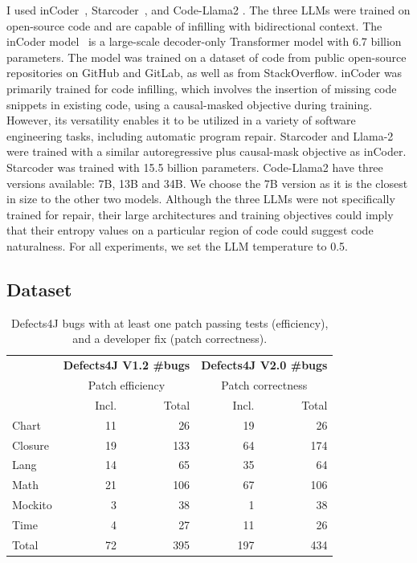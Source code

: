 \documentclass[12pt,openany,oneside,table]{cmuthesis}
\begin{document}
I used inCoder~\cite{inCoder}, Starcoder~\cite{Starcoder}, and Code-Llama2
\cite{Llama}. The three LLMs were trained on open-source code and are capable of
infilling with bidirectional context. The inCoder model~\cite{inCoder} is a
large-scale decoder-only Transformer model with 6.7 billion parameters. The
model was trained on a dataset of code from public open-source repositories on
GitHub and GitLab, as well as from StackOverflow. 
inCoder was primarily trained for code infilling, which involves the insertion
of missing code snippets in existing code, using a causal-masked objective
during training. However, its versatility enables it to be utilized in a variety
of software engineering tasks, including automatic program repair. Starcoder and
Llama-2 were trained with a similar autoregressive plus causal-mask objective as
inCoder. Starcoder was trained with 15.5 billion parameters. Code-Llama2 have
three versions available: 7B, 13B and 34B. We choose the 7B version as it is
the closest in size to the other two models. Although the three LLMs were
not specifically trained for repair, their large architectures and training
objectives could imply that their entropy values on a particular region of code
could suggest code naturalness. For all experiments, we set the LLM temperature
to 0.5.

\subsection{Dataset}
\label{sec:dataset}

\begin{table}[t]
    \centering
  \caption{\small Defects4J bugs with at least one patch passing tests (efficiency), and a developer fix (patch correctness).}
  \begin{tabular}{l|rr|rr}
  \toprule
  & \multicolumn{2}{c}{\textbf{Defects4J V1.2 \#bugs}}  & \multicolumn{2}{c}{\textbf{Defects4J V2.0 \#bugs}}  \\
  & \multicolumn{2}{c}{Patch efficiency}  & \multicolumn{2}{c}{Patch
  correctness}  \\
  & Incl. & Total & Incl. & Total \\
  \midrule
  Chart  & 11  & 26 & 19  & 26\\
  Closure  & 19 & 133&  64 & 174\\
  Lang  & 14 &65& 35 & 64\\
  Math  & 21 & 106 & 67  & 106\\
  Mockito  & 3 & 38&  1  &38\\
  Time  & 4 & 27  & 11 & 26\\
  \midrule
  Total & 72 & 395 & 197 & 434 \\
  \bottomrule
  \end{tabular}
  \label{table:datasets}
  \end{table}
\end{document}
